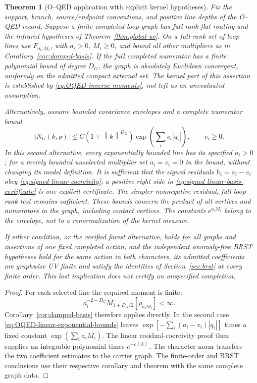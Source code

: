 \documentclass[final,5p,times,twocolumn,numbers,nopreprintline]{elsarticle}
\numberwithin{equation}{section}
\newtheorem{theorem}{Theorem}[section]
\theoremstyle{definition}
\theoremstyle{remark}
\newcommand{\norm}[1]{\left\lVert #1\right\rVert}
\begin{document}
\begin{theorem}[O--QED application with explicit kernel hypotheses]
\label{thm:OQED-fixed-graph}
Fix the support, branch, source/endpoint conventions, and positive
line depths of the O--QED record. Suppose a finite completed loop graph
has full-rank flat routing and the infrared hypotheses of
Theorem~\ref{thm:global-uv}. On a full-rank set of loop lines use
\(F_{a_i,M_i}\), with \(a_i>0\), \(M_i\geq0\), and bound all
other multipliers as in Corollary~\ref{cor:damped-basis}.
If the full completed numerator has a finite polynomial bound of degree
\(D_G\), the graph is absolutely Euclidean convergent, uniformly on
the admitted compact external set. The kernel part of this assertion
is established by \eqref{eq:OQED-inverse-moments}, not left as an
unevaluated assumption.

Alternatively, assume bounded covariance envelopes and a complete
numerator bound
\begin{equation}
 |N_G(k,p)|\leq C(1+\norm{k}^{D_G})
          \exp\!\left(\sum_i v_i|q_i|\right),\qquad v_i\geq0.
\label{eq:OQED-vertex-budget}
\end{equation}
In this second alternative, every exponentially bounded line has its
specified \(a_i>0\); for a merely bounded unselected multiplier set
\(a_i=v_i=0\) in the bound, without changing its model definition.
It is sufficient that the signed residuals \(h_i=a_i-v_i\) obey
\eqref{eq:signed-linear-coercivity}; a positive right side in
\eqref{eq:signed-linear-basis-certificate} is one explicit certificate.
The simpler nonnegative-residual, full-loop-rank test remains sufficient.
These bounds concern the product of all vertices and numerators in the
graph, including contact vertices. The constants \(e^{a_iM_i}\) belong
to the envelope, not to a renormalization of the kernel measure.

If either condition, or the verified forest alternative, holds for
all graphs and insertions of one fixed completed action, and the
independent anomaly-free BRST hypotheses hold for the same action in
both characters, its admitted coefficients are graphwise UV finite and
satisfy the identities of Section~\ref{sec:brst} at every finite order.
This last implication does not certify an unspecified completion.
\end{theorem}

\begin{proof}
For each selected line the required moment is finite:
\[
 a_i^{-2-D_G}M_{1+D_G/2}[\rho_{a_iM_i}]<\infty.
\]
Corollary~\ref{cor:damped-basis} therefore applies directly. In the second case
\eqref{eq:OQED-linear-exponential-bounds} leaves
\(\exp[-\sum_i(a_i-v_i)|q_i|]\) times a fixed constant
\(\exp(\sum_i a_iM_i)\). The linear residual-coercivity proof then
supplies an integrable polynomial times \(e^{-c\norm{k}}\).
The character norm transfers the two coefficient estimates to the
carrier graph. The finite-order and BRST conclusions use their respective
corollary and theorem with the same complete graph data.
\end{proof}
\end{document}

